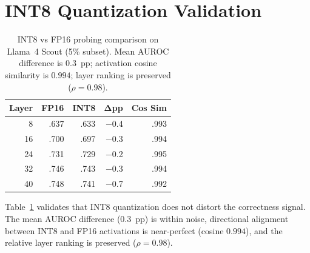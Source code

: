 \documentclass[11pt,a4paper]{article}
\begin{document}


\appendix
\section{INT8 Quantization Validation}
\label{app:int8}

\begin{table}[h]
\centering
\small
\begin{tabular}{rrrrr}
\toprule
\textbf{Layer} & \textbf{FP16} & \textbf{INT8} & $\boldsymbol{\Delta}$\textbf{pp} & \textbf{Cos Sim} \\
\midrule
8  & .637 & .633 & $-$0.4 & .993 \\
16 & .700 & .697 & $-$0.3 & .994 \\
24 & .731 & .729 & $-$0.2 & .995 \\
32 & .746 & .743 & $-$0.3 & .994 \\
40 & .748 & .741 & $-$0.7 & .992 \\
\bottomrule
\end{tabular}
\caption{INT8 vs FP16 probing comparison on Llama~4 Scout (5\% subset). Mean AUROC difference is $0.3$~pp; activation cosine similarity is $0.994$; layer ranking is preserved ($\rho{=}0.98$).}
\label{tab:int8}
\end{table}

Table~\ref{tab:int8} validates that INT8 quantization does not distort the correctness signal.
The mean AUROC difference ($0.3$~pp) is within noise, directional alignment between INT8 and FP16 activations is near-perfect (cosine $0.994$), and the relative layer ranking is preserved ($\rho{=}0.98$).
\end{document}

